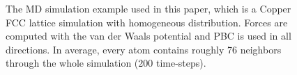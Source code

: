 \documentclass[Afour,sageh,times]{sagej}
\begin{document}
\begin{figure}[tb]
    \centering
    \caption{The MD simulation example used in this paper, which is a Copper FCC lattice simulation with homogeneous distribution. Forces are computed with the van der Waals potential and PBC is used in all directions. In average, every atom contains roughly 76 neighbors through the whole simulation (200 time-steps).}
    \label{fig:copper_fcc_lattice}
\end{figure}
\end{document}
